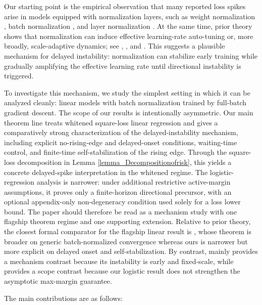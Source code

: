 \documentclass[pdflatex,sn-basic]{sn-jnl}%
\theoremstyle{thmstyleone}%
\begin{document}
Our starting point is the empirical observation that many reported loss spikes arise in models equipped with normalization layers, such as weight normalization \citep{WN}, batch normalization \citep{BN}, and layer normalization \citep{LN}. At the same time, prior theory shows that normalization can induce effective learning-rate auto-tuning or, more broadly, scale-adaptive dynamics; see \citet{arora2018theoretical}, \citet{hoffer2018norm}, and \citet{morwani2022inductive}. This suggests a plausible mechanism for delayed instability: normalization can stabilize early training while gradually amplifying the effective learning rate until directional instability is triggered.

To investigate this mechanism, we study the simplest setting in which it can be analyzed cleanly: linear models with batch normalization trained by full-batch gradient descent. The scope of our results is intentionally asymmetric. Our main theorem line treats whitened square-loss linear regression and gives a comparatively strong characterization of the delayed-instability mechanism, including explicit no-rising-edge and delayed-onset conditions, waiting-time control, and finite-time self-stabilization of the rising edge. Through the square-loss decomposition in Lemma \ref{lemma_Decompositionofrisk}, this yields a concrete delayed-spike interpretation in the whitened regime. The logistic-regression analysis is narrower: under additional restrictive active-margin assumptions, it proves only a finite-horizon directional precursor, with an optional appendix-only non-degeneracy condition used solely for a loss lower bound. The paper should therefore be read as a mechanism study with one flagship theorem regime and one supporting extension. Relative to prior theory, the closest formal comparator for the flagship linear result is \citet{arora2018theoretical}, whose theorem is broader on generic batch-normalized convergence whereas ours is narrower but more explicit on delayed onset and self-stabilization. By contrast, \citet{eos_logistic_regression} mainly provides a mechanism contrast because its instability is early and fixed-scale, while \citet{implicit_bias_BN} provides a scope contrast because our logistic result does not strengthen the asymptotic max-margin guarantee.

The main contributions are as follows:


\end{document}
